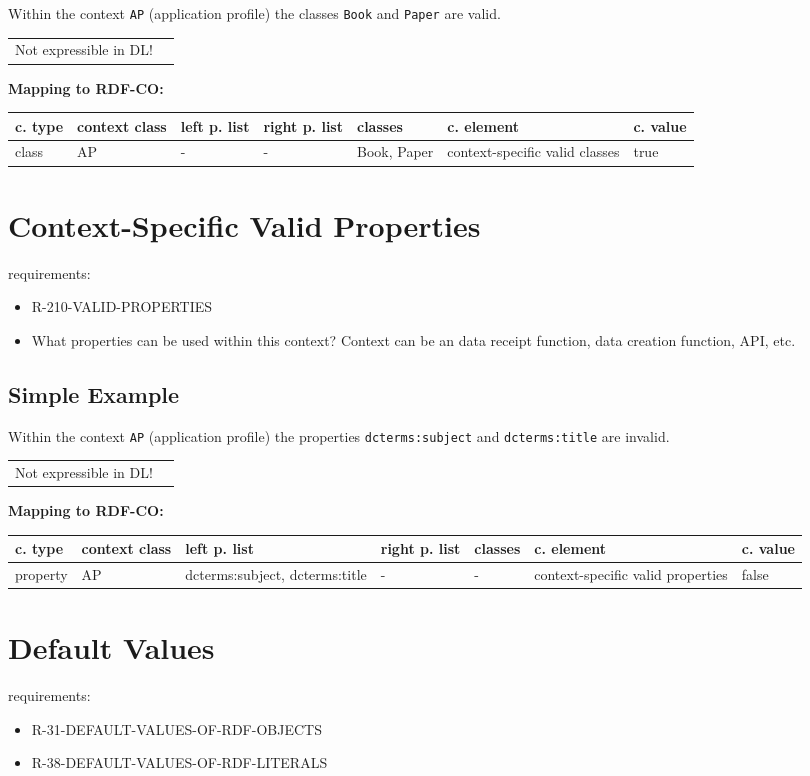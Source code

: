 \documentclass{llncs}
\newcommand{\ms}[1]{\texttt{#1}}
\newenvironment{gcotable}{
  \scriptsize
  \sffamily
  \vspace{0cm}
	\begin{center}
	\textbf{\vspace{0.4cm}Mapping to RDF-CO:} \\
  \begin{tabular}{l|l|l|l|l|l|l}
	\hline
  \textbf{c. type} & \textbf{context class} & \textbf{left p. list} & \textbf{right p. list} & \textbf{classes} & \textbf{c. element} & \textbf{c. value} \\
  \hline

}{
  \hline
  \end{tabular}
	\end{center}
}
\newenvironment{DL}{
  \vspace{0cm}
	\begin{center}
  \begin{tabular}{r l}

}{
  \end{tabular}
	\end{center}
}
\begin{document}
Within the context \ms{AP} (application profile) the classes \ms{Book} and \ms{Paper} are valid.

\begin{DL}
Not expressible in DL!
\end{DL}

\begin{gcotable}
class & AP & - & - & Book, Paper & context-specific valid classes & true \\
\end{gcotable}

\section{Context-Specific Valid Properties}

requirements:

\begin{itemize}
	\item R-210-VALID-PROPERTIES
\end{itemize}

\begin{itemize}
	\item What properties can be used within this context? Context can be an data receipt function, data creation function, API, etc.
\end{itemize}

\subsection{Simple Example}

Within the context \ms{AP} (application profile) the properties \ms{dcterms:subject} and \ms{dcterms:title} are invalid.

\begin{DL}
Not expressible in DL!
\end{DL}

\begin{gcotable}
property & AP & dcterms:subject, dcterms:title & - & - & context-specific valid properties & false \\
\end{gcotable}

\section{Default Values}

requirements:

\begin{itemize}
	\item R-31-DEFAULT-VALUES-OF-RDF-OBJECTS
  \item R-38-DEFAULT-VALUES-OF-RDF-LITERALS
\end{itemize}
\end{document}
